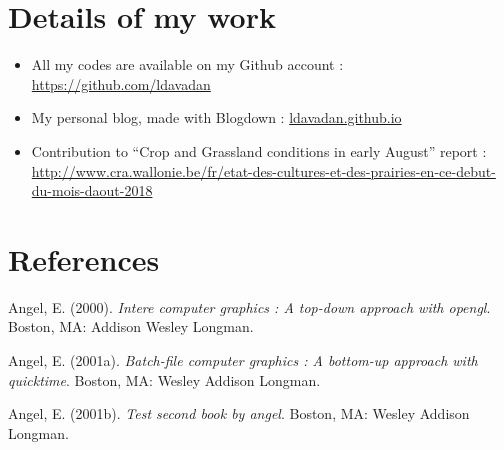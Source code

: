 \documentclass[12pt,twoside]{reedthesis}
\theoremstyle{definition}
\theoremstyle{definition}
\theoremstyle{definition}
\theoremstyle{remark}
\begin{document}
\chapter{Details of my work}\label{details-of-my-work}
\begin{itemize}
\item
  All my codes are available on my Github account :
  \url{https://github.com/ldavadan}
\item
  My personal blog, made with Blogdown : \url{ldavadan.github.io}
\item
  Contribution to ``Crop and Grassland conditions in early August''
  report :
  \url{http://www.cra.wallonie.be/fr/etat-des-cultures-et-des-prairies-en-ce-debut-du-mois-daout-2018}
\end{itemize}
\backmatter

\chapter*{References}\label{references}


\noindent

\setlength{\parindent}{-0.20in} \setlength{\leftskip}{0.20in}
\setlength{\parskip}{8pt}

\hypertarget{refs}{}
\hypertarget{ref-angel2000}{}
Angel, E. (2000). \emph{Intere computer graphics : A top-down approach
with opengl}. Boston, MA: Addison Wesley Longman.

\hypertarget{ref-angel2001}{}
Angel, E. (2001a). \emph{Batch-file computer graphics : A bottom-up
approach with quicktime}. Boston, MA: Wesley Addison Longman.

\hypertarget{ref-angel2002a}{}
Angel, E. (2001b). \emph{Test second book by angel}. Boston, MA: Wesley
Addison Longman.

\end{document}
